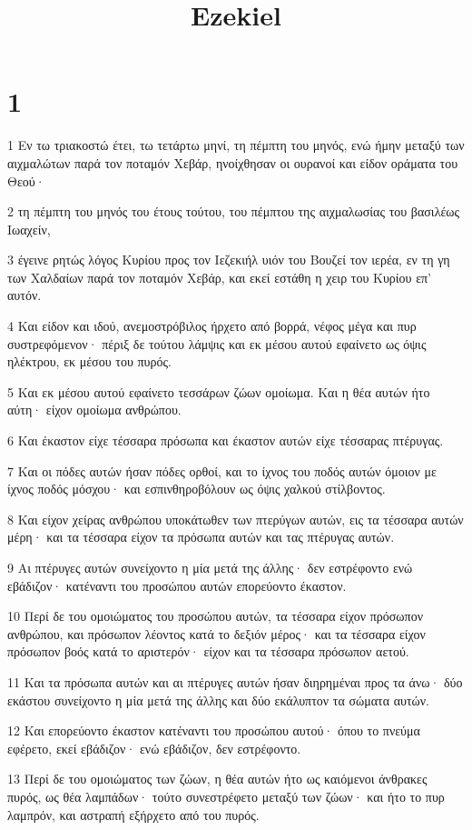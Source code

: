 

\title{Ezekiel}


\chapter{1}

\par 1 Εν τω τριακοστώ έτει, τω τετάρτω μηνί, τη πέμπτη του μηνός, ενώ ήμην μεταξύ των αιχμαλώτων παρά τον ποταμόν Χεβάρ, ηνοίχθησαν οι ουρανοί και είδον οράματα του Θεού·
\par 2 τη πέμπτη του μηνός του έτους τούτου, του πέμπτου της αιχμαλωσίας του βασιλέως Ιωαχείν,
\par 3 έγεινε ρητώς λόγος Κυρίου προς τον Ιεζεκιήλ υιόν του Βουζεί τον ιερέα, εν τη γη των Χαλδαίων παρά τον ποταμόν Χεβάρ, και εκεί εστάθη η χειρ του Κυρίου επ' αυτόν.
\par 4 Και είδον και ιδού, ανεμοστρόβιλος ήρχετο από βορρά, νέφος μέγα και πυρ συστρεφόμενον· πέριξ δε τούτου λάμψις και εκ μέσου αυτού εφαίνετο ως όψις ηλέκτρου, εκ μέσου του πυρός.
\par 5 Και εκ μέσου αυτού εφαίνετο τεσσάρων ζώων ομοίωμα. Και η θέα αυτών ήτο αύτη· είχον ομοίωμα ανθρώπου.
\par 6 Και έκαστον είχε τέσσαρα πρόσωπα και έκαστον αυτών είχε τέσσαρας πτέρυγας.
\par 7 Και οι πόδες αυτών ήσαν πόδες ορθοί, και το ίχνος του ποδός αυτών όμοιον με ίχνος ποδός μόσχου· και εσπινθηροβόλουν ως όψις χαλκού στίλβοντος.
\par 8 Και είχον χείρας ανθρώπου υποκάτωθεν των πτερύγων αυτών, εις τα τέσσαρα αυτών μέρη· και τα τέσσαρα είχον τα πρόσωπα αυτών και τας πτέρυγας αυτών.
\par 9 Αι πτέρυγες αυτών συνείχοντο η μία μετά της άλλης· δεν εστρέφοντο ενώ εβάδιζον· κατέναντι του προσώπου αυτών επορεύοντο έκαστον.
\par 10 Περί δε του ομοιώματος του προσώπου αυτών, τα τέσσαρα είχον πρόσωπον ανθρώπου, και πρόσωπον λέοντος κατά το δεξιόν μέρος· και τα τέσσαρα είχον πρόσωπον βοός κατά το αριστερόν· είχον και τα τέσσαρα πρόσωπον αετού.
\par 11 Και τα πρόσωπα αυτών και αι πτέρυγες αυτών ήσαν διηρημέναι προς τα άνω· δύο εκάστου συνείχοντο η μία μετά της άλλης και δύο εκάλυπτον τα σώματα αυτών.
\par 12 Και επορεύοντο έκαστον κατέναντι του προσώπου αυτού· όπου το πνεύμα εφέρετο, εκεί εβάδιζον· ενώ εβάδιζον, δεν εστρέφοντο.
\par 13 Περί δε του ομοιώματος των ζώων, η θέα αυτών ήτο ως καιόμενοι άνθρακες πυρός, ως θέα λαμπάδων· τούτο συνεστρέφετο μεταξύ των ζώων· και ήτο το πυρ λαμπρόν, και αστραπή εξήρχετο από του πυρός.
